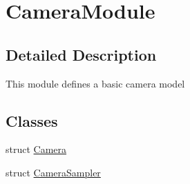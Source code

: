 \hypertarget{group___camera_module}{}\section{Camera\+Module}
\label{group___camera_module}


\subsection{Detailed Description}
This module defines a basic camera model \subsection*{Classes}
\begin{DoxyCompactItemize}
\item 
struct \hyperlink{struct_camera}{Camera}
\item 
struct \hyperlink{struct_camera_sampler}{Camera\+Sampler}
\end{DoxyCompactItemize}

